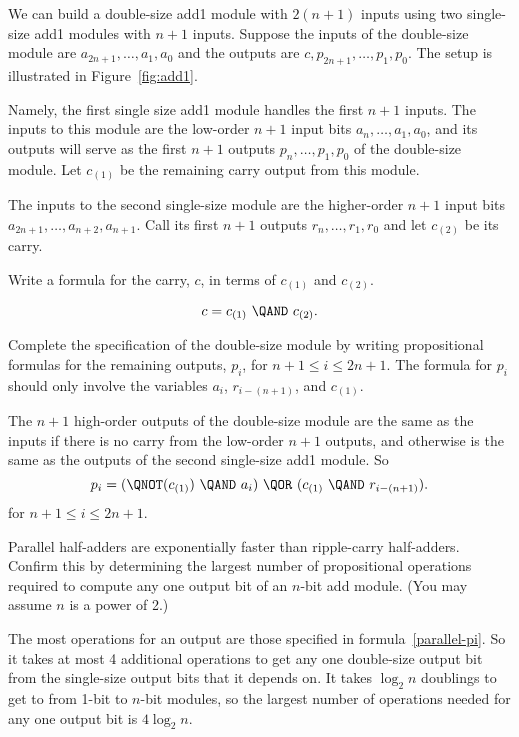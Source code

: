 \documentclass[handout]{mcs}
\begin{document}
\begin{problem}
We can build a double-size add1 module with $2(n+1)$ inputs using two
single-size add1 modules with $n+1$ inputs.  Suppose the inputs of the
double-size module are $a_{2n+1},\dots, a_1, a_0$ and the outputs are
$c,p_{2n+1},\dots, p_1,p_0$.  The setup is illustrated in
Figure~\ref{fig:add1}.

Namely, the first single size add1 module handles the first $n+1$ inputs.
The inputs to this module are the low-order $n+1$ input bits $a_n,\dots,
a_1, a_0$, and its outputs will serve as the first $n+1$ outputs $p_n,
\dots, p_1, p_0$ of the double-size module.  Let $c_{(1)}$ be the
remaining carry output from this module.

The inputs to the second single-size module are the higher-order $n+1$
input bits $a_{2n+1}, \dots, a_{n+2}, a_{n+1}$.  Call its first $n+1$
outputs $r_n, \dots, r_1, r_0$ and let $c_{(2)}$ be its carry.

\bparts

\ppart Write a formula for the carry, $c$, in terms of $c_{(1)}$ and
$c_{(2)}$.

\begin{solution}

\[
c = c_{(1)}\ \QAND\ c_{(2)}.
\]

\end{solution}

\ppart Complete the specification of the double-size module by writing
propositional formulas for the remaining outputs, $p_i$, for $n+1 \leq i
\leq 2n+1$.  The formula for $p_i$ should only involve the variables
$a_i$, $r_{i-(n+1)}$, and $c_{(1)}$.

\begin{solution}
 The $n+1$ high-order outputs of the double-size module are the
  same as the inputs if there is no carry from the low-order $n+1$
  outputs, and otherwise is the same as the outputs of the second
  single-size add1 module.  So
\begin{equation}\label{parallel-pi}
p_i = (\QNOT(c_{(1)})\ \QAND\ a_i)\ \QOR\ (c_{(1)}\ \QAND\ r_{i-(n+1)}).
\end{equation}
for $n+1 \leq i \leq 2n+1$.
\end{solution}

\ppart Parallel half-adders are exponentially faster than ripple-carry
half-adders.  Confirm this by determining the largest number of
propositional operations required to compute any one output bit of an
$n$-bit add module.  (You may assume $n$ is a power of 2.)

\begin{solution}
 The most operations for an output are those specified in
  formula~\eqref{parallel-pi}.  So it takes at most 4 additional
  operations to get any one double-size output bit from the single-size
  output bits that it depends on.  It takes $\log_2 n$ doublings to get to
  from 1-bit to $n$-bit modules, so the largest number of operations
  needed for any one output bit is $4 \log_2 n$.


\end{solution}
\end{problem}
\end{document}
